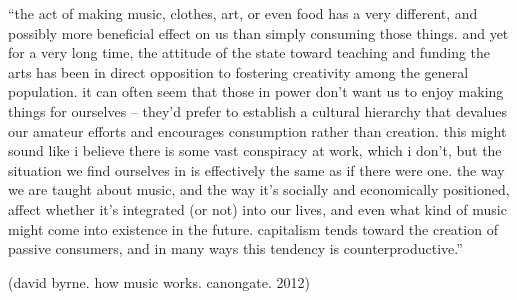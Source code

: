 \documentclass[12pt,a4paper,british,landscape]{article}
\begin{document}
\begin{center}


\vspace{0.2cm}

``the act of making music, clothes, art, or even food has a very different, and possibly more beneficial effect on us than simply consuming those things.
and yet for a very long time, the attitude of the state toward teaching and funding the arts has been in direct opposition to fostering creativity among the general population.
it can often seem that those in power don't want us to enjoy making things for ourselves -- they'd prefer to establish a cultural hierarchy that devalues our amateur efforts and encourages consumption rather than creation.
this might sound like i believe there is some vast conspiracy at work, which i don't, but the situation we find ourselves in is effectively the same as if there were one.
the way we are taught about music, and the way it’s socially and economically positioned, affect whether it's integrated (or not) into our lives, and even what kind of music might come into existence in the future.
capitalism tends toward the creation of passive consumers, and in many ways this tendency is counterproductive.''

\vspace{0.5cm}

(david byrne. how music works. canongate. 2012)


\end{center}
\end{document}
